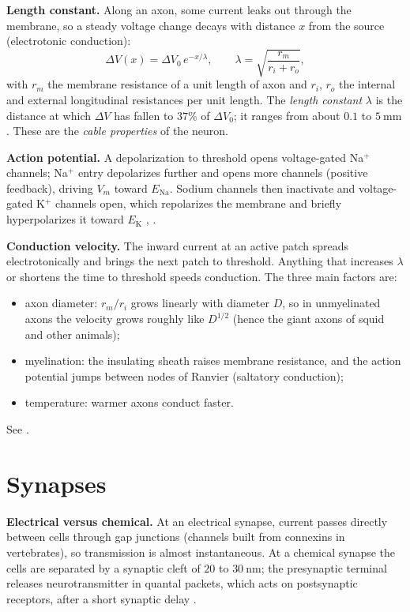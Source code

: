 \textbf{Length constant.}
Along an axon, some current leaks out
through the membrane, so a steady voltage
change decays with distance $x$ from the
source (electrotonic conduction):
$$
\Delta V(x) = \Delta V_0\, e^{-x/\lambda},
\qquad
\lambda = \sqrt{\frac{r_m}{r_i + r_o}},
$$
with $r_m$ the membrane resistance of a
unit length of axon and $r_i$, $r_o$ the
internal and external longitudinal
resistances per unit length. The
\emph{length constant} $\lambda$ is the
distance at which $\Delta V$ has fallen to
$37\%$ of $\Delta V_0$; it ranges from
about $0.1$ to $5\ \mathrm{mm}$
\cite[Chapter 6]{randall1997eckert}. These
are the \emph{cable properties} of the
neuron.

\textbf{Action potential.}
A depolarization to threshold opens
voltage-gated Na$^+$ channels; Na$^+$
entry depolarizes further and opens more
channels (positive feedback), driving
$V_m$ toward $E_{\mathrm{Na}}$. Sodium
channels then inactivate and
voltage-gated K$^+$ channels open, which
repolarizes the membrane and briefly
hyperpolarizes it toward $E_{\mathrm{K}}$
\cite[Chapter 12]{hill2012animal},
\cite[Chapter 5]{randall1997eckert}.

\textbf{Conduction velocity.}
The inward current at an active patch
spreads electrotonically and brings the
next patch to threshold. Anything that
increases $\lambda$ or shortens the time to
threshold speeds conduction. The three
main factors are:
\begin{itemize}
\item axon diameter: $r_m/r_i$ grows
linearly with diameter $D$, so in
unmyelinated axons the velocity grows
roughly like $D^{1/2}$ (hence the giant
axons of squid and other animals);
\item myelination: the insulating sheath
raises membrane resistance, and the
action potential jumps between nodes of
Ranvier (saltatory conduction);
\item temperature: warmer axons conduct
faster.
\end{itemize}
See \cite[Chapter 12]{hill2012animal}.

\section{Synapses}
\label{section-synapses}

\textbf{Electrical versus chemical.}
At an electrical synapse, current passes
directly between cells through gap
junctions (channels built from connexins
in vertebrates), so transmission is
almost instantaneous. At a chemical
synapse the cells are separated by a
synaptic cleft of $20$ to $30\
\mathrm{nm}$; the presynaptic terminal
releases neurotransmitter in quantal
packets, which acts on postsynaptic
receptors, after a short synaptic delay
\cite[Chapter 13]{hill2012animal}.

